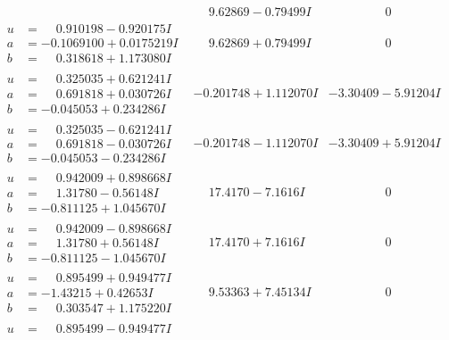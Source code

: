 \documentclass[1p]{elsarticle_modified}
\theoremstyle{definition}
\begin{document}
$$\begin{array}{c|c|c}
 & \phantom{-}9.62869 - 0.79499 I & \phantom{-0.000000 } 0 \\ \hline\begin{aligned}
u &= \phantom{-}0.910198 - 0.920175 I \\
a &= -0.1069100 + 0.0175219 I \\
b &= \phantom{-}0.318618 + 1.173080 I\end{aligned}
 & \phantom{-}9.62869 + 0.79499 I & \phantom{-0.000000 } 0 \\ \hline\begin{aligned}
u &= \phantom{-}0.325035 + 0.621241 I \\
a &= \phantom{-}0.691818 + 0.030726 I \\
b &= -0.045053 + 0.234286 I\end{aligned}
 & -0.201748 + 1.112070 I & -3.30409 - 5.91204 I \\ \hline\begin{aligned}
u &= \phantom{-}0.325035 - 0.621241 I \\
a &= \phantom{-}0.691818 - 0.030726 I \\
b &= -0.045053 - 0.234286 I\end{aligned}
 & -0.201748 - 1.112070 I & -3.30409 + 5.91204 I \\ \hline\begin{aligned}
u &= \phantom{-}0.942009 + 0.898668 I \\
a &= \phantom{-}1.31780 - 0.56148 I \\
b &= -0.811125 + 1.045670 I\end{aligned}
 & \phantom{-}17.4170 - 7.1616 I & \phantom{-0.000000 } 0 \\ \hline\begin{aligned}
u &= \phantom{-}0.942009 - 0.898668 I \\
a &= \phantom{-}1.31780 + 0.56148 I \\
b &= -0.811125 - 1.045670 I\end{aligned}
 & \phantom{-}17.4170 + 7.1616 I & \phantom{-0.000000 } 0 \\ \hline\begin{aligned}
u &= \phantom{-}0.895499 + 0.949477 I \\
a &= -1.43215 + 0.42653 I \\
b &= \phantom{-}0.303547 + 1.175220 I\end{aligned}
 & \phantom{-}9.53363 + 7.45134 I & \phantom{-0.000000 } 0 \\ \hline\begin{aligned}
u &= \phantom{-}0.895499 - 0.949477 I \\

\end{aligned}
\end{array}$$
\end{document}
